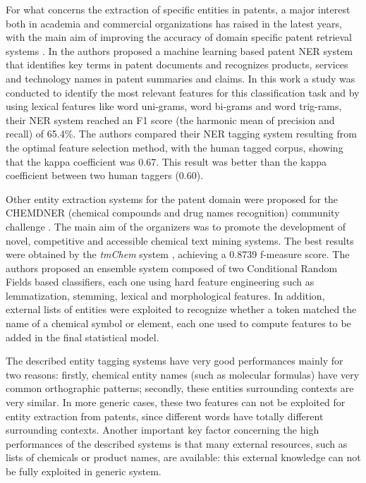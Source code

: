 \documentclass[]{book}
\begin{document}
For what concerns the extraction of specific entities in patents, a
major interest both in academia and commercial organizations has raised
in the latest years, with the main aim of improving the accuracy of
domain specific patent retrieval systems \citep{chemdner}. In
\citep{lee-ner13} the authors proposed a machine learning based patent
NER system that identifies key terms in patent documents and recognizes
products, services and technology names in patent summaries and claims.
In this work a study was conducted to identify the most relevant
features for this classification task and by using lexical features like
word uni-grams, word bi-grams and word trig-rams, their NER system
reached an F1 score (the harmonic mean of precision and recall) of
65.4\%. The authors compared their NER tagging system resulting from the
optimal feature selection method, with the human tagged corpus, showing
that the kappa coefficient was 0.67. This result was better than the
kappa coefficient between two human taggers (0.60).

Other entity extraction systems for the patent domain were proposed for
the CHEMDNER (chemical compounds and drug names recognition) community
challenge \citep{chemdner}. The main aim of the organizers was to
promote the development of novel, competitive and accessible chemical
text mining systems. The best results were obtained by the \emph{tmChem}
system \citep{leaman2015}, achieving a 0.8739 f-measure score. The
authors proposed an ensemble system composed of two Conditional Random
Fields based classifiers, each one using hard feature engineering such
as lemmatization, stemming, lexical and morphological features. In
addition, external lists of entities were exploited to recognize whether
a token matched the name of a chemical symbol or element, each one used
to compute features to be added in the final statistical model.

The described entity tagging systems have very good performances mainly
for two reasons: firstly, chemical entity names (such as molecular
formulas) have very common orthographic patterns; secondly, these
entities surrounding contexts are very similar. In more generic cases,
these two features can not be exploited for entity extraction from
patents, since different words have totally different surrounding
contexts. Another important key factor concerning the high performances
of the described systems is that many external resources, such as lists
of chemicals or product names, are available: this external knowledge
can not be fully exploited in generic system.
\end{document}
